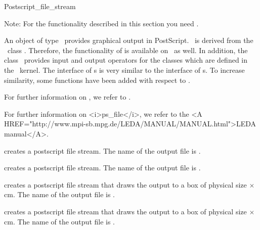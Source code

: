 \ccSetTwoColumns{}{\hspace*{8.5cm}}

\medskip
\begin{ccClass} {Postscript_file_stream}

Note: For the functionality described in this section you need \leda.

\ccDefinition 
An object of type \ccClassName\ provides graphical output in PostScript.
\ccClassName\ is derived from the \leda\ class .
Therefore, the functionality of  is available on \ccClassName\ as well.
In addition, the class \ccClassName\ provides input and output 
operators for the classes which are defined in the \cgal\ kernel.
The interface of \ccClassName s is very similar to the interface of s. 
To increase similarity, some functions have been added with respect to .
\begin{ccTexOnly}
For further information on , we refer to \cite{mnsu-lum}.
\end{ccTexOnly}
\begin{ccHtmlOnly}
For further information on <i>ps_file</i>, we refer to the 
<A HREF="http://www.mpi-sb.mpg.de/LEDA/MANUAL/MANUAL.html">LEDA manual</A>.
\end{ccHtmlOnly}


\ccCreation
{}

{creates a postscript file stream. The name of the output file is
 .}

{creates a postscript file stream. The name of the output file is
 .}

{creates a postscript file stream that draws the output to a box
of physical size  $\times$  cm.
The name of the output file is  .}

{creates a postscript file stream that draws the output to a box
of physical size  $\times$  cm.
The name of the output file is  .}



\end{ccClass}
